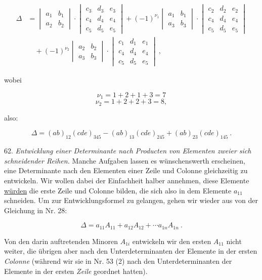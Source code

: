 \documentclass[11pt]{article}
\providecommand{\weq}[2]{\begin{equation}\tag{#1}#2\end{equation}}
\let\Delta\varDelta
\begin{document}
\[
\begin{aligned}
\Delta &= \begin{vmatrix} a_1 & b_1 \\ a_2 & b_2 \end{vmatrix} \cdot
\begin{vmatrix} c_3 & d_3 & e_3 \\ c_4 & d_4 & e_4 \\ c_5 & d_5 & e_5 \end{vmatrix}
+ (-1)^{\nu_1} \begin{vmatrix} a_1 & b_1 \\ a_3 & b_3 \end{vmatrix} \cdot
\begin{vmatrix} c_2 & d_2 & e_2 \\ c_4 & d_4 & e_4 \\ c_5 & d_5 & e_5 \end{vmatrix}\\
&\quad + (-1)^{\nu_2} \begin{vmatrix} a_2 & b_2 \\ a_3 & b_3 \end{vmatrix} \cdot
\begin{vmatrix} c_1 & d_1 & e_1 \\ c_4 & d_4 & e_4 \\ c_5 & d_5 & e_5 \end{vmatrix}\ ,
\end{aligned}
\]

wobei

\[
\nu_1 = 1 + 2 + 1 + 3 = 7
\]
\[
\nu_2 = 1 + 2 + 2 + 3 = 8,
\]

also:

\[
\Delta = (ab)_{12}(cde)_{345} - (ab)_{13}(cde)_{245} + (ab)_{23}(cde)_{145}\ .
\]

62. \textit{Entwicklung einer Determinante nach Producten von Elementen zweier sich
schneidender Reihen.} Manche Aufgaben lassen es w\"unschenswerth erscheinen, eine
Determinante nach den Elementen einer Zeile und Colonne gleichzeitig zu entwickeln. Wir
wollen dabei der Einfachheit halber annehmen, diese Elemente \underline{w\"urden} %
die erste Zeile und Colonne bilden, die sich also in dem Elemente $a_{11}$ schneiden. Um zur
Entwicklungsformel zu gelangen, gehen wir wieder aus von der Gleichung in Nr. 28:

\weq{1}{\Delta = a_{11}A_{11} + a_{12}A_{12} + \cdots a_{1n}A_{1n}\ .}

Von den darin auftretenden Minoren $A_{1i}$ entwickeln wir den ersten $A_{11}$ nicht weiter,
die \"ubrigen aber nach den Unterdeterminanten der Elemente in der ersten \textit{Colonne}
(w\"ahrend wir sie in Nr. 53 (2) nach den Unterdeterminanten der Elemente in der ersten
\textit{Zeile} geordnet hatten).
\end{document}
